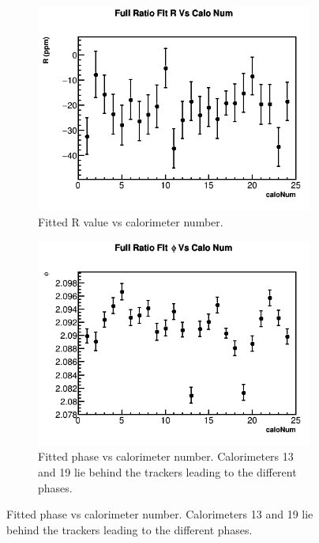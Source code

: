 	\begin{figure}[h]
	\centering
	    \begin{subfigure}[t]{0.4\textwidth}
		    \centering
			\includegraphics[width=\textwidth]{RatioCBOFit_R_Vs_Calo_Canv}
		    \caption{Fitted R value vs calorimeter number.}
	    \end{subfigure}
	    \hspace{4mm}
	    \begin{subfigure}[t]{0.4\textwidth}
		    \centering
			\includegraphics[width=\textwidth]{RatioCBOFit_phi_Vs_Calo_Canv}
		    \caption{Fitted \gmtwo phase vs calorimeter number. Calorimeters 13 and 19 lie behind the trackers leading to the different \gmtwo phases.}
	    \end{subfigure}%

\end{figure}
